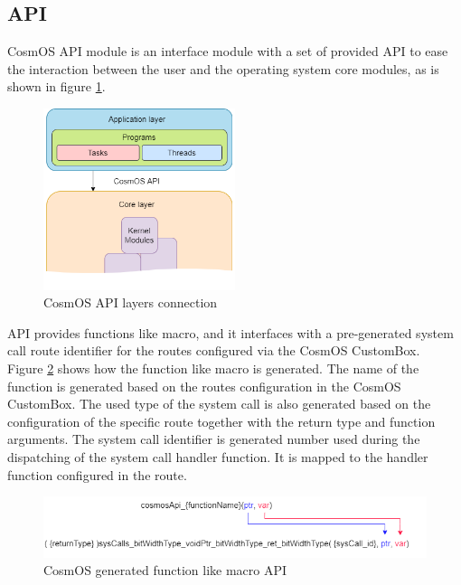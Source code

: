 \subsection{API}
CosmOS API module is an interface module with a set of provided \ac{API} to ease the interaction between the user and the operating system core modules, as is shown in figure \ref{fig:CosmOSAPI}.

\begin{figure}[H]
\begin{center}
\includegraphics[width=0.5\textwidth]{images/cosmos_api.png}
\caption{CosmOS API layers connection}
\label{fig:CosmOSAPI}
\end{center}
\end{figure}

\ac{API} provides functions like macro, and it interfaces with a pre-generated system call route identifier for the routes configured via the CosmOS CustomBox.\\
\indent Figure \ref{fig:CosmOSAPIfunctionAsMacro} shows how the function like macro is generated. The name of the function is generated based on the routes configuration in the CosmOS CustomBox. The used type of the system call is also generated based on the configuration of the specific route together with the return type and function arguments. The system call identifier is generated number used during the dispatching of the system call handler function. It is mapped to the handler function configured in the route.

\begin{figure}[H]
\begin{center}
\includegraphics[width=1\textwidth]{images/cosmosAPI.png}
\caption{CosmOS generated function like macro API}
\label{fig:CosmOSAPIfunctionAsMacro}
\end{center}
\end{figure}


